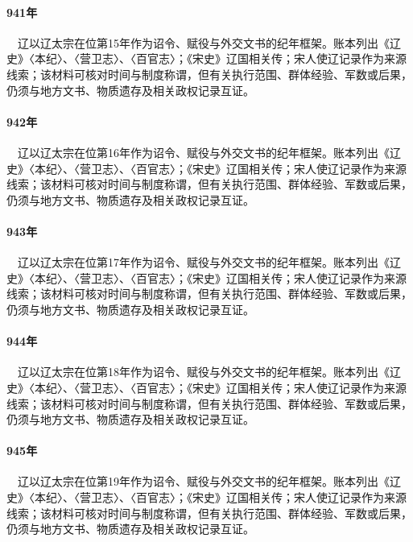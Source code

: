 \paragraph{941年}　辽以辽太宗在位第15年作为诏令、赋役与外交文书的纪年框架。账本列出《辽史》〈本纪〉、〈营卫志〉、〈百官志〉；《宋史》辽国相关传；宋人使辽记录作为来源线索；该材料可核对时间与制度称谓，但有关执行范围、群体经验、军数或后果，仍须与地方文书、物质遗存及相关政权记录互证。

\paragraph{942年}　辽以辽太宗在位第16年作为诏令、赋役与外交文书的纪年框架。账本列出《辽史》〈本纪〉、〈营卫志〉、〈百官志〉；《宋史》辽国相关传；宋人使辽记录作为来源线索；该材料可核对时间与制度称谓，但有关执行范围、群体经验、军数或后果，仍须与地方文书、物质遗存及相关政权记录互证。

\paragraph{943年}　辽以辽太宗在位第17年作为诏令、赋役与外交文书的纪年框架。账本列出《辽史》〈本纪〉、〈营卫志〉、〈百官志〉；《宋史》辽国相关传；宋人使辽记录作为来源线索；该材料可核对时间与制度称谓，但有关执行范围、群体经验、军数或后果，仍须与地方文书、物质遗存及相关政权记录互证。

\paragraph{944年}　辽以辽太宗在位第18年作为诏令、赋役与外交文书的纪年框架。账本列出《辽史》〈本纪〉、〈营卫志〉、〈百官志〉；《宋史》辽国相关传；宋人使辽记录作为来源线索；该材料可核对时间与制度称谓，但有关执行范围、群体经验、军数或后果，仍须与地方文书、物质遗存及相关政权记录互证。

\paragraph{945年}　辽以辽太宗在位第19年作为诏令、赋役与外交文书的纪年框架。账本列出《辽史》〈本纪〉、〈营卫志〉、〈百官志〉；《宋史》辽国相关传；宋人使辽记录作为来源线索；该材料可核对时间与制度称谓，但有关执行范围、群体经验、军数或后果，仍须与地方文书、物质遗存及相关政权记录互证。

